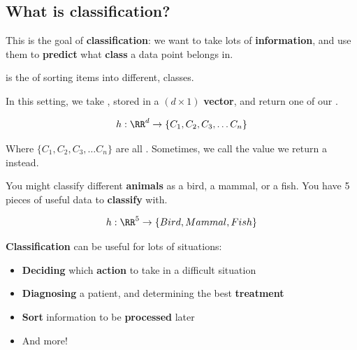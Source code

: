     \subsection{What is classification?}
        
        This is the goal of \textbf{classification}: we want to take lots of \textbf{information}, and use them to \textbf{predict} what \textbf{class} a data point belongs in.\\
        
        \begin{definition}
             is the  of sorting items into different,  classes.
            
            In this setting, we take , stored in a $(d \times 1)$ \textbf{vector}, and return one of our .
            
            \begin{equation*}
                h: \RR^d \rightarrow \{C_1, C_2, C_3, \dots C_n\}
            \end{equation*}
            
            Where $\{C_1, C_2, C_3, \dots C_n\}$ are all . Sometimes, we call the value we return a  instead.
        \end{definition}
        
        
        \miniex You might classify different \textbf{animals} as a bird, a mammal, or a fish. You have 5 pieces of useful data to \textbf{classify} with.
        
        \begin{equation}
            h: \RR^5 \rightarrow \{ Bird, Mammal, Fish \}
        \end{equation}
        
                \textbf{Classification} can be useful for lots of situations:

        \begin{itemize}
            \item \textbf{Deciding} which \textbf{action} to take in a difficult situation
            
            \item \textbf{Diagnosing} a patient, and determining the best \textbf{treatment}
            
            \item \textbf{Sort} information to be \textbf{processed} later
            \item And more!\\
        \end{itemize}
        
